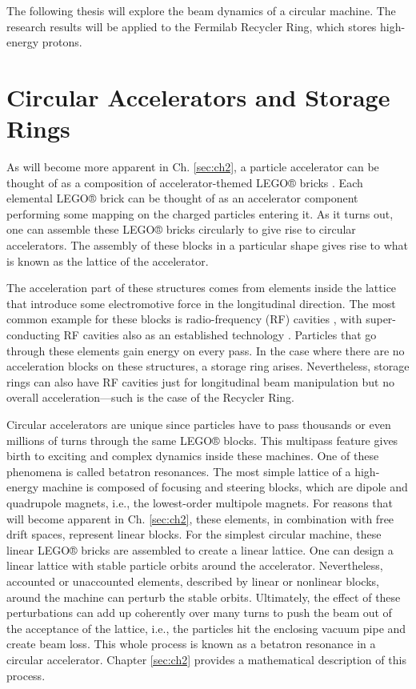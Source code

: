 The following thesis will explore the beam dynamics of a circular machine. The research results will be applied to the Fermilab Recycler Ring, which stores high-energy protons.

\section{Circular Accelerators and Storage Rings}

As will become more apparent in Ch. \ref{sec:ch2}, a particle accelerator can be thought of as a composition of accelerator-themed LEGO® bricks \cite{forest}. Each elemental LEGO® brick can be thought of as an accelerator component performing some mapping on the charged particles entering it. As it turns out, one can assemble these LEGO® bricks circularly to give rise to circular accelerators. The assembly of these blocks in a particular shape gives rise to what is known as the lattice of the accelerator.

The acceleration part of these structures comes from elements inside the lattice that introduce some electromotive force in the longitudinal direction. The most common example for these blocks is radio-frequency (RF) cavities \cite{sylee}, with super-conducting RF cavities also as an established technology \cite{srfcavs}. Particles that go through these elements gain energy on every pass. In the case where there are no acceleration blocks on these structures, a storage ring arises. Nevertheless, storage rings can also have RF cavities just for longitudinal beam manipulation but no overall acceleration---such is the case of the Recycler Ring.    

Circular accelerators are unique since particles have to pass thousands or even millions of turns through the same LEGO® blocks. This multipass feature gives birth to exciting and complex dynamics inside these machines. One of these phenomena is called betatron resonances. The most simple lattice of a high-energy machine is composed of focusing and steering blocks, which are dipole and quadrupole magnets, i.e., the lowest-order multipole magnets. For reasons that will become apparent in Ch. \ref{sec:ch2}, these elements, in combination with free drift spaces, represent linear blocks. For the simplest circular machine, these linear LEGO® bricks are assembled to create a linear lattice. One can design a linear lattice with stable particle orbits around the accelerator. Nevertheless, accounted or unaccounted elements, described by linear or nonlinear blocks, around the machine can perturb the stable orbits. Ultimately, the effect of these perturbations can add up coherently over many turns to push the beam out of the acceptance of the lattice, i.e., the particles hit the enclosing vacuum pipe and create beam loss. This whole process is known as a betatron resonance in a circular accelerator. Chapter \ref{sec:ch2} provides a mathematical description of this process.

